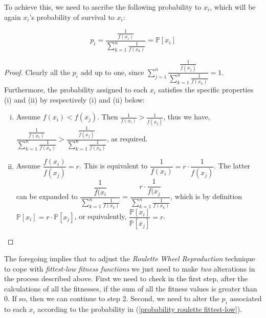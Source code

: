 \documentclass[a4paper]{article}
\newcommand{\Prob}[1]{\mathbb{P}[#1]}
\theoremstyle{dotless}
\begin{document}
To achieve this, we need to ascribe the following probability to $x_i$, which will be again $x_i$'s probability of survival to $x_i$:

\begin{equation}\label{probability roulette fittest-low}
p_i = \dfrac{\frac{1}{f(x_i)}}{\sum^n_{k=1} \frac{1}{f(x_k)}} = \Prob{x_i}
\end{equation}

\begin{proof} Clearly all the $p_i$ add up to one, since $\sum^n_{j=1} \dfrac{\frac{1}{f(x_j)}}{\sum^n_{k=1} \frac{1}{f(x_k)}} = 1$. Furthermore, the probability assigned to each $x_i$ satisfies the specific properties (i) and (ii) by respectively (i) and (ii) below:
\begin{enumerate}[(i)]
\item Assume $f(x_i) < f(x_j)$. Then $\frac{1}{f(x_i)} > \frac{1}{f(x_j)}$, thus we have, 
$\dfrac{\frac{1}{f(x_i)}}{\sum^n_{k=1} \frac{1}{f(x_k)}} > \dfrac{\frac{1}{f(x_j)}}{\sum^n_{k=1} \frac{1}{f(x_k)}}$, as required.
\item Assume $\dfrac{f(x_i)}{f(x_j)} = r$. This is equivalent to $\dfrac{1}{f(x_i)} = r \cdot \dfrac{1}{f(x_j)}$. The latter can be expanded to $
\dfrac{\dfrac{1}{f(x_i}}{\sum^n_{k=1} \frac{1}{f(x_k)}} = \dfrac{r \cdot \dfrac{1}{f(x_j}}{\sum^n_{k=1} \frac{1}{f(x_k)}}$, which is by definition $\Prob{x_i} = r \cdot \Prob{x_j}$, or equivalently, $\dfrac{\Prob{x_i}}{\Prob{x_j}} = r$.
\end{enumerate}
\end{proof}

The foregoing implies that to adjust the \emph{Roulette Wheel  Reproduction} technique to cope with \emph{fittest-low fitness functions} we just need to make \textit{two} alterations in the process described above. First we need to check in the first step, after the calculations of all the fitnesses, if the sum of all the fitness values is greater than 0. If so, then we can continue to step 2. Second, we need to alter the $p_i$ associated to each $x_i$ according to the probability in (\ref{probability roulette fittest-low}).\\
\end{document}
